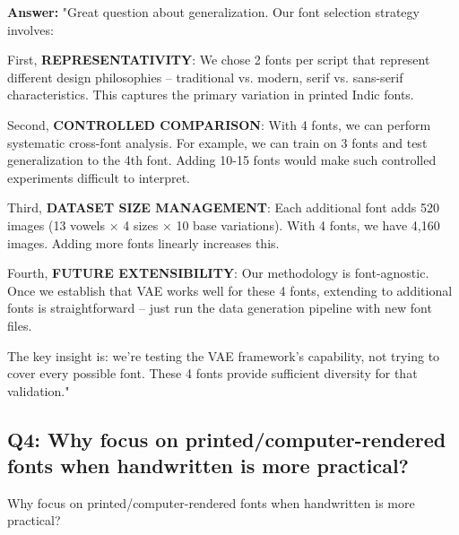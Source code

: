 \documentclass[11pt,a4paper]{article}
\begin{document}
\begin{answerbox}
\textbf{Answer:} "Great question about generalization. Our font selection strategy involves:

First, \textbf{REPRESENTATIVITY}: We chose 2 fonts per script that represent different design philosophies -- traditional vs. modern, serif vs. sans-serif characteristics. This captures the primary variation in printed Indic fonts.

Second, \textbf{CONTROLLED COMPARISON}: With 4 fonts, we can perform systematic cross-font analysis. For example, we can train on 3 fonts and test generalization to the 4th font. Adding 10-15 fonts would make such controlled experiments difficult to interpret.

Third, \textbf{DATASET SIZE MANAGEMENT}: Each additional font adds 520 images (13 vowels × 4 sizes × 10 base variations). With 4 fonts, we have 4,160 images. Adding more fonts linearly increases this.

Fourth, \textbf{FUTURE EXTENSIBILITY}: Our methodology is font-agnostic. Once we establish that VAE works well for these 4 fonts, extending to additional fonts is straightforward -- just run the data generation pipeline with new font files.

The key insight is: we're testing the VAE framework's capability, not trying to cover every possible font. These 4 fonts provide sufficient diversity for that validation."
\end{answerbox}

\subsection{Q4: Why focus on printed/computer-rendered fonts when handwritten is more practical?}

\begin{qbox}[title=Question]
Why focus on printed/computer-rendered fonts when handwritten is more practical?
\end{qbox}
\end{document}
